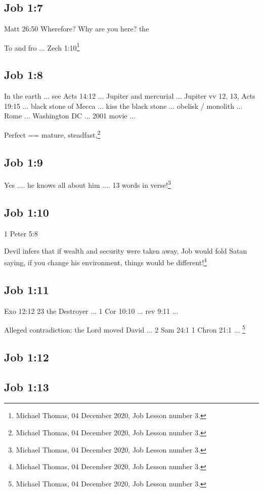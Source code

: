 \subsection{Job 1:7}
Matt 26:50
Wherefore? Why are you here? the 

To and fro ... Zech 1:10\footnote{Michael Thomas, 04 December 2020, Job Lesson number 3.}

\subsection{Job 1:8}
In the earth ... 
see Acts 14:12 ... Jupiter and mercurial ... Jupiter vv 12, 13, 
Acts 19:15 ... black stone of Mecca ... kiss the black stone ... obelisk / monolith ... Rome ... Washington DC ... 2001 movie ... 

Perfect == mature, steadfast,\footnote{Michael Thomas, 04 December 2020, Job Lesson number 3.}

\subsection{Job 1:9}
Yes .... he knows all about him .... 
13 words in verse!\footnote{Michael Thomas, 04 December 2020, Job Lesson number 3.}

\subsection{Job 1:10}
1 Peter 5:8

Devil infers that if wealth and security were taken away, Job would fold
Satan saying, if you change his environment, things would be different!\footnote{Michael Thomas, 04 December 2020, Job Lesson number 3.}

\subsection{Job 1:11}
Exo 12:12 23 the Destroyer ... 1 Cor 10:10 ... rev 9:11 ...

Alleged contradiction: the Lord moved David ... 2 Sam 24:1 1 Chron 21:1 ... \footnote{Michael Thomas, 04 December 2020, Job Lesson number 3.}



\subsection{Job 1:12}

\subsection{Job 1:13}

